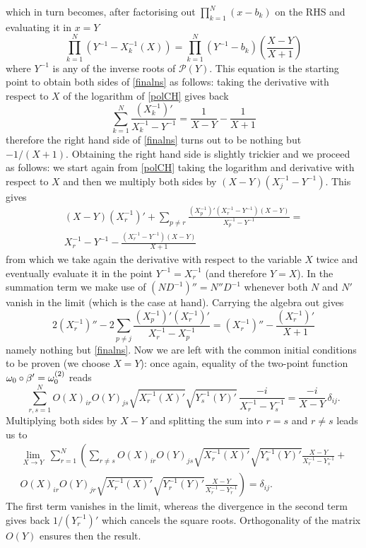 which in turn becomes, after factorising out 
$\prod_{k=1}^N(x-b_k)$ 
on the RHS and evaluating it in $x=Y$
\begin{equation}
\label{polCH}
\prod_{k=1}^N (Y^{-1}-X_k^{-1}(X))=\prod_{k=1}^N(Y^{-1}-b_k)
\left(\frac{X-Y}{X+1}\right)
\end{equation}
where $Y^{-1}$ is any of the inverse roots of $\mathcal{P}(Y)$.
This equation is the starting point to obtain both sides of
\eqref{finalns} as follows: taking the derivative with respect to
$X$ of the logarithm of \eqref{polCH} gives back
\[
\sum_{k=1}^N\frac{(X_k^{-1})'}{X_k^{-1}-Y^{-1}}=
\frac{1}{X-Y} - \frac{1}{X+1}
\]
therefore the right hand side of \eqref{finalns} turns out 
to be nothing but $-1/(X+1)$. Obtaining the right hand side
is slightly trickier and we proceed as follows: we start 
again from \eqref{polCH} taking the logarithm and derivative
with respect to $X$ and then we multiply both sides 
by $(X-Y)(X_j^{-1}-Y^{-1})$. This gives 
\begin{multline*}
(X-Y)(X_r^{-1})' +\sum_{p\neq r} \frac{(X_p^{-1})' 
(X_r^{-1}-Y^{-1})(X-Y)}{X_p^{-1}-Y^{-1}}=\\
X_r^{-1}-Y^{-1} - \frac{(X_r^{-1}-Y^{-1})(X-Y)}{X+1}
\end{multline*}
from which we take again the derivative with respect to
the variable $X$ twice and eventually evaluate it in the
point $Y^{-1}=X_r^{-1}$ (and therefore $Y=X$). In the summation
term we make use of $(ND^{-1})'' = N'' D^{-1}$ whenever both
$N$ and $N'$ vanish in the limit (which is the case at hand).
Carrying the algebra out gives
\[
2 (X_r^{-1})'' - 2 \sum_{p\neq j} \frac{(X_p^{-1})'(X_r^{-1})'}
{X_r^{-1}-X_p^{-1}}= (X_r^{-1})'' - \frac{(X_r^{-1})'}{X+1}
\]
namely nothing but \eqref{finalns}. Now we are left with the 
common initial conditions to be proven (we choose $X=Y$): 
once again, equality of the two-point function 
$\omega_0\circ\beta'=\omega_0^{(2)}$ reads
\[
\sum_{r,s=1}^N O(X)_{ir} O(Y)_{js}\sqrt{{X_r^{-1}(X)}'}
\sqrt{{Y_s^{-1}(Y)}'}\,\frac{-i}{X_r^{-1}-Y_s^{-1}}
=\frac{-i}{X-Y}\,\delta_{ij}.
\]
Multiplying both sides by $X-Y$ and splitting the sum into
$r=s$ and $r\neq s$ leads us to
\begin{multline*}
\lim_{X\to Y}\ \sum_{r=1}^N\left(\sum_{r\neq s} 
O(X)_{ir} O(Y)_{js}\sqrt{{X_r^{-1}(X)}'} \sqrt{{Y_s^{-1}(Y)}'}
\frac{X-Y}{X_r^{-1}-Y_s^{-1}}+\right.\\
\left. O(X)_{ir} O(Y)_{jr}\sqrt{{X_r^{-1}(X)}'} \sqrt{{Y_r^{-1}(Y)}'}
\frac{X-Y}{X_r^{-1}-Y_r^{-1}}\right)=\delta_{ij}.
\end{multline*}
The first term vanishes in the limit, whereas the 
divergence in the second term gives back $1/(Y_r^{-1})'$ 
which cancels the square roots. Orthogonality of the 
matrix $O(Y)$ ensures then the result.

